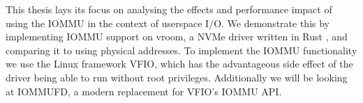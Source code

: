 This thesis lays its focus on analysing the effects and performance impact of using the IOMMU in the context of userspace I/O.
We demonstrate this by implementing IOMMU support on vroom, a NVMe driver written in Rust \cite{vroom}, and comparing it to using physical addresses. To implement the IOMMU functionality we use the Linux framework VFIO, which has the advantageous side effect of the driver being able to run without root privileges. Additionally we will be looking at IOMMUFD, a modern replacement for VFIO's IOMMU API.
